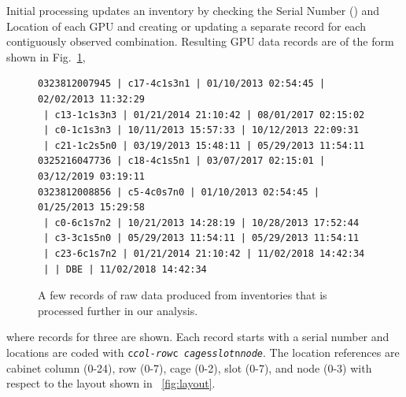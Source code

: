 Initial processing updates an inventory by checking the Serial Number
() and Location of each GPU and creating or updating a
separate record for each contiguously observed
 combination. Resulting GPU data records are
of the form shown in Fig.~\ref{fig:dataraw},
\begin{figure}[tb]
{\notsotiny
\begin{verbatim}
0323812007945 | c17-4c1s3n1 | 01/10/2013 02:54:45 | 02/02/2013 11:32:29
 | c13-1c1s3n3 | 01/21/2014 21:10:42 | 08/01/2017 02:15:02
 | c0-1c1s3n3 | 10/11/2013 15:57:33 | 10/12/2013 22:09:31
 | c21-1c2s5n0 | 03/19/2013 15:48:11 | 05/29/2013 11:54:11
0325216047736 | c18-4c1s5n1 | 03/07/2017 02:15:01 | 03/12/2019 03:19:11
0323812008856 | c5-4c0s7n0 | 01/10/2013 02:54:45 | 01/25/2013 15:29:58
 | c0-6c1s7n2 | 10/21/2013 14:28:19 | 10/28/2013 17:52:44
 | c3-3c1s5n0 | 05/29/2013 11:54:11 | 05/29/2013 11:54:11
 | c23-6c1s7n2 | 01/21/2014 21:10:42 | 11/02/2018 14:42:34
 | | DBE | 11/02/2018 14:42:34
\end{verbatim}
}
\caption{A few records of raw data produced from inventories  that is processed further in our analysis.}
\label{fig:dataraw}
\end{figure}
where records for three are shown. Each record starts with a serial
number and locations are coded with {\tt c{\it col-row}c{\it
    cage}s{\it slot}n{\it node}}. The location references are cabinet
column (0-24), row (0-7), cage (0-2), slot (0-7), and node (0-3) with
respect to the layout shown in ~\ref{fig:layout}. 
